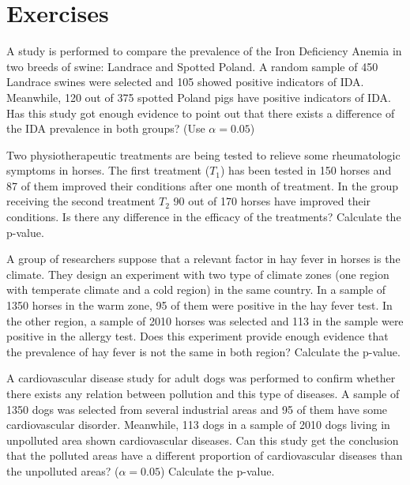 \section{Exercises}
\label{TwoSampleExercises}
  
\begin{problem}
  A study is performed to compare the prevalence of the Iron Deficiency Anemia in two breeds of swine: Landrace and Spotted Poland. A random sample of 450  Landrace swines were selected and 105 showed positive indicators of IDA. Meanwhile, 120 out  of 375 spotted Poland pigs have  positive indicators of IDA. Has this study got enough evidence to point out that there exists a difference of the IDA prevalence in both groups? (Use $\alpha=0.05$)
\end{problem}

\begin{problem}
  Two physiotherapeutic treatments are being tested   to relieve some
  rheumatologic symptoms in horses. The first treatment ($T_1$) has
  been tested in 150 horses and 87 of them improved their conditions after one month of treatment. In the  group receiving the second treatment $T_2$ 90 out of 170 horses have improved their conditions. Is there any difference in the efficacy of the treatments? Calculate the p-value.
\end{problem}


\begin{problem}
  A group of researchers suppose that a relevant factor in hay fever
  in horses is the climate. They design an experiment with two type of climate zones (one region with temperate climate and a cold region) in the same country. In a sample of 1350 horses in the warm zone, 95 of them were positive in the hay fever test.  In the other region, a sample of 2010 horses was selected and 113 in the sample were positive in the allergy test. Does this experiment provide enough evidence that the prevalence of hay fever is not the same in both region?   Calculate the p-value.  
\end{problem}

\begin{problem}
  A cardiovascular disease study for adult dogs was performed to
  confirm whether there exists any relation between pollution  and
  this type of diseases. A sample of 1350 dogs was selected from
  several industrial areas and 95 of them have some cardiovascular
  disorder. Meanwhile, 113 dogs in a sample of 2010 dogs living in
  unpolluted area shown cardiovascular diseases. Can this study get
  the conclusion that the polluted areas have a different proportion
  of cardiovascular diseases than the unpolluted areas? ($\alpha=0.05$) Calculate the p-value.  
\end{problem}

